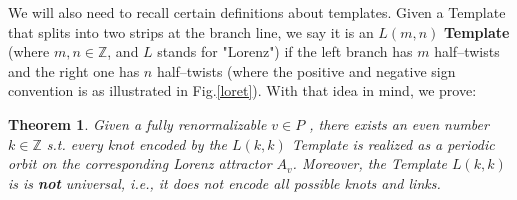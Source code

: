 \documentclass[10pt,reqno]{amsart}
\theoremstyle{plain}
\theoremstyle{assumption}
\theoremstyle{notation}
\theoremstyle{claim}
\theoremstyle{conj}
\theoremstyle{theorem}
\newtheorem{theorem}{Theorem}[section]
\theoremstyle{proposition}
\theoremstyle{corollary}
\begin{document}
We will also need to recall certain definitions about templates. Given a Template that splits into two strips at the branch line, we say it is an $L(m,n)$ \textbf{Template} (where $m,n\in\mathbb{Z}$, and $L$ stands for "Lorenz") if the left branch has $m$ half--twists and the right one has $n$ half--twists (where the positive and negative sign convention is as illustrated in Fig.\ref{loret}). With that idea in mind, we prove:
\begin{theorem}
    \label{templateth} Given a fully renormalizable $v\in P$ , there exists an even number $k\in\mathbb{Z}$ s.t. every knot encoded by the $L(k,k)$ Template is realized as a periodic orbit on the corresponding Lorenz attractor $A_v$. Moreover, the Template $L(k,k)$ is is \textbf{not} universal, i.e., it does not encode all possible knots and links.
\end{theorem}
\end{document}
